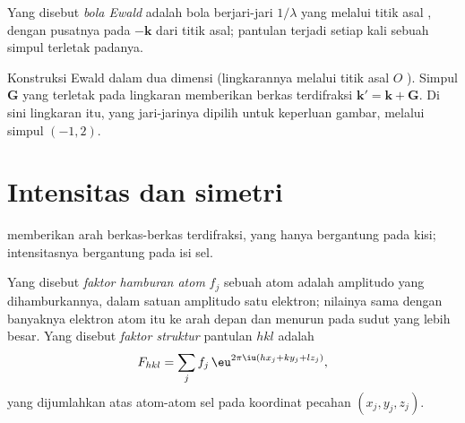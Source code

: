 \begin{definition}\label{def:b3:x-ray-diffraction:ewald}
Yang disebut \emph{bola Ewald} adalah bola berjari-jari
$1/\lambda$ yang melalui titik asal , dengan pusatnya pada $-\mathbf k$
dari titik asal; pantulan terjadi setiap kali sebuah simpul 
terletak padanya.
\end{definition}

\begin{omfigure}

{\small Konstruksi Ewald dalam dua dimensi (lingkarannya melalui titik asal $O$
). Simpul $\mathbf G$ yang terletak pada lingkaran memberikan
berkas terdifraksi $\mathbf k' = \mathbf k + \mathbf G$. Di sini lingkaran itu, yang
jari-jarinya dipilih untuk keperluan gambar, melalui simpul $(-1, 2)$.}
\end{omfigure}

\section{Intensitas dan simetri}

 memberikan arah berkas-berkas terdifraksi, yang hanya bergantung
pada kisi; intensitasnya bergantung pada isi sel.

\begin{definition}\label{def:b3:x-ray-diffraction:structure-factor}
Yang disebut \emph{faktor hamburan atom} $f_j$
sebuah atom adalah amplitudo yang dihamburkannya, dalam satuan amplitudo satu
elektron; nilainya sama dengan banyaknya elektron atom itu ke arah depan dan
menurun pada sudut yang lebih besar. Yang disebut \emph{faktor
struktur} pantulan $hkl$ adalah
\[
F_{hkl} = \sum_jf_j\,\eu^{2\pi\iu(hx_j + ky_j + lz_j)},
\]
yang dijumlahkan atas atom-atom sel pada koordinat pecahan $(x_j, y_j, z_j)$.
\end{definition}

